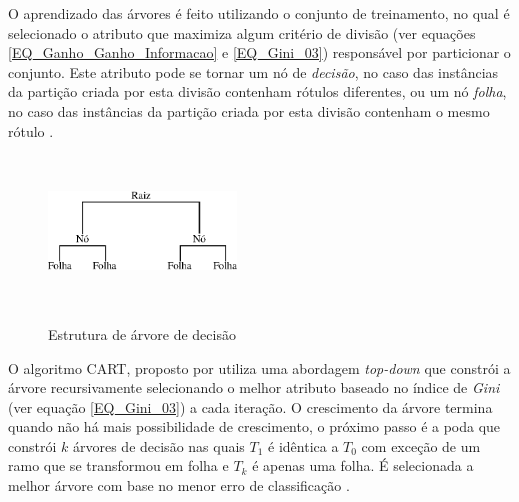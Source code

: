 O aprendizado das árvores é feito utilizando o conjunto de treinamento, no qual é selecionado o atributo que maximiza algum critério de divisão (ver equações \eqref{EQ_Ganho_Ganho_Informacao} e \eqref{EQ_Gini_03}) responsável por particionar o conjunto. Este atributo pode se tornar um nó de \emph{decisão}, no caso das instâncias da partição criada por esta divisão contenham rótulos diferentes, ou um nó \emph{folha}, no caso das instâncias da partição criada por esta divisão contenham o mesmo rótulo \cite{HanKamber2011}.
\begin{figure}[hbt]
	\centering
 	  \caption{Estrutura de árvore de decisão}
		\includegraphics[width=5cm, height=4cm]{./secoes/conceitosFundamentais/pics/img/Arvore.eps}
	\label{FIGURA_ARVORE_DECISAO}
	\vspace{0.1cm}
\end{figure}

O algoritmo CART, proposto por  utiliza uma abordagem \emph{top-down} que constrói a árvore recursivamente selecionando o melhor atributo baseado no índice de \emph{Gini} (ver equação \eqref{EQ_Gini_03}) a cada iteração. O crescimento da árvore termina quando não há mais possibilidade de crescimento, o próximo passo é a poda que constrói \(k\) árvores de decisão nas quais \(T_{1}\) é idêntica a \(T_{0}\) com exceção de um ramo que se transformou em folha e \(T_{k}\) é apenas uma folha. É selecionada a melhor árvore com base no menor erro de classificação \cite{Breiman1984}. 

